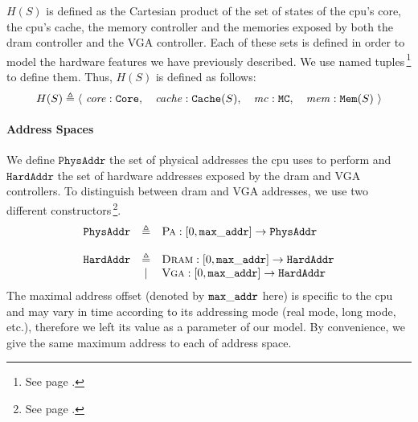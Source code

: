 $H(S)$ is defined as the Cartesian product of the set of states of the
\ac{cpu}'s core, the \ac{cpu}'s cache, the memory controller and the memories
exposed by both the \ac{dram} controller and the VGA controller.
%
Each of these sets is defined in order to model the hardware features we have
previously described.
%
We use named tuples\,\footnote{See page \pageref{frontmatter:notations}.} to
define them.
%
Thus, $H(S)$ is defined as follows:
%
\[
  H(S) \triangleq \left<\ \mathit{core}: \texttt{Core},\quad\mathit{cache}:
    \texttt{Cache}(S),\quad\mathit{mc}: \texttt{MC},\quad\mathit{mem}:
    \texttt{Mem}(S) \ \right>
\]


\paragraph{Address Spaces}
%
We define $\texttt{PhysAddr}$ the set of physical addresses the \ac{cpu} uses to
perform \IO and $\texttt{HardAddr}$ the set of hardware addresses exposed by the
\ac{dram} and VGA controllers.
%
To distinguish between \ac{dram} and VGA addresses, we use two different
constructors\,\footnote{See page \pageref{frontmatter:notations}.}.
%
\[
  \begin{array}{rcl}
    \texttt{PhysAddr}
    & \triangleq
    & \textsc{Pa} : [0, \val{max\_addr}] \rightarrow
      \texttt{PhysAddr} \\
    & %
    & \\ %
    \texttt{HardAddr}
    & \triangleq
    & \textsc{Dram} : [0, \val{max\_addr}] \rightarrow
      \texttt{HardAddr} \\
    & |
    & \textsc{Vga} : [0, \val{max\_addr}] \rightarrow
      \texttt{HardAddr}
  \end{array}
\]
%
The maximal address offset (denoted by $\mathtt{max\_addr}$ here) is specific to
the \ac{cpu} and may vary in time according to its addressing mode (real mode,
long mode, etc.), therefore we left its value as a parameter of our model.
%
By convenience, we give the same maximum address to each of  address space.

